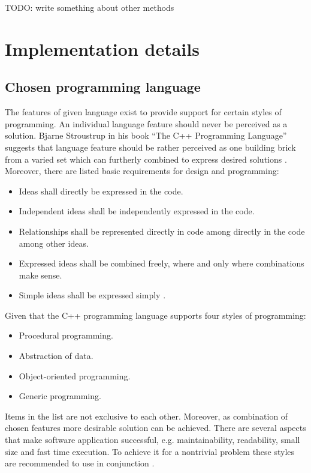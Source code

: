 TODO: write something about other methods

\section{Implementation details}

\subsection{Chosen programming language}

The features of given language exist to provide support for certain styles of programming. An individual
language feature should never be perceived as a solution. Bjarne Stroustrup in his book ``The C++ Programming Language''
suggests that language feature should be rather perceived as one building brick from a varied set which can
furtherly combined to express desired solutions \cite{cpp_language_bjarne}. Moreover, there are listed
basic requirements for design and programming:
\begin{itemize}
    \item Ideas shall directly be expressed in the code.
    \item Independent ideas shall be independently expressed in the code.
    \item Relationships shall be represented directly in code among directly in the code among other ideas.
    \item Expressed ideas shall be combined freely, where and only where combinations make sense.
    \item Simple ideas shall be expressed simply \cite{cpp_language_bjarne}.
\end{itemize}

Given that the C++ programming language supports four styles of programming:
\begin{itemize}
    \item Procedural programming.
    \item Abstraction of data.
    \item Object-oriented programming.
    \item Generic programming.
\end{itemize}
Items in the list are not exclusive to each other. Moreover, as combination of chosen features
more desirable solution can be achieved. There are several aspects that make software application
successful, e.g. maintainability, readability, small size and fast time execution. To achieve it
for a nontrivial problem these styles are recommended to use in conjunction \cite{cpp_language_bjarne}.

